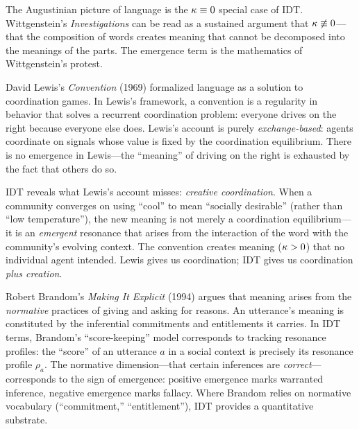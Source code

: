 \begin{interpretation}
The Augustinian picture of language is the $\kappa \equiv 0$ special case
of IDT. Wittgenstein's \emph{Investigations} can be read as a sustained
argument that $\kappa \not\equiv 0$---that the composition of words creates
meaning that cannot be decomposed into the meanings of the parts. The
emergence term is the mathematics of Wittgenstein's protest.
\end{interpretation}

\begin{interpretation}
David Lewis's \emph{Convention} (1969) formalized language as a solution to
coordination games. In Lewis's framework, a convention is a regularity in
behavior that solves a recurrent coordination problem: everyone drives on
the right because everyone else does. Lewis's account is purely
\emph{exchange-based}: agents coordinate on signals whose value is fixed
by the coordination equilibrium. There is no emergence in Lewis---the
``meaning'' of driving on the right is exhausted by the fact that others
do so.

IDT reveals what Lewis's account misses: \emph{creative coordination}.
When a community converges on using ``cool'' to mean ``socially desirable''
(rather than ``low temperature''), the new meaning is not merely a
coordination equilibrium---it is an \emph{emergent} resonance that arises
from the interaction of the word with the community's evolving context.
The convention creates meaning ($\kappa > 0$) that no individual agent
intended. Lewis gives us coordination; IDT gives us coordination
\emph{plus creation}.
\end{interpretation}

\begin{remark}
Robert Brandom's \emph{Making It Explicit} (1994) argues that meaning
arises from the \emph{normative} practices of giving and asking for
reasons. An utterance's meaning is constituted by the inferential
commitments and entitlements it carries. In IDT terms, Brandom's
``score-keeping'' model corresponds to tracking resonance profiles:
the ``score'' of an utterance $a$ in a social context is precisely
its resonance profile $\rho_a$. The normative dimension---that certain
inferences are \emph{correct}---corresponds to the sign of emergence:
positive emergence marks warranted inference, negative emergence marks
fallacy. Where Brandom relies on normative vocabulary (``commitment,''
``entitlement''), IDT provides a quantitative substrate.
\end{remark}

